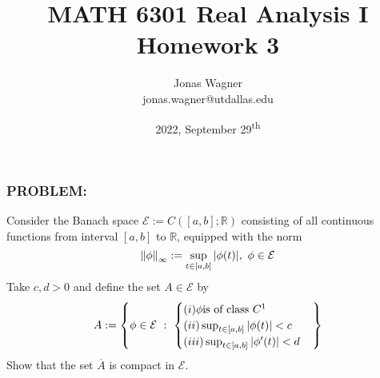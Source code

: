 \documentclass[]{article}
\title{MATH 6301 Real Analysis I \\ Homework 3}
\author{Jonas Wagner\\ jonas.wagner@utdallas.edu}
\date{2022, September 29\textsuperscript{th}}
\newcommand{\Problem}{\subsubsection*{\textbf{PROBLEM:}}}
\newcommand{\R}{\mathbb{R}}
\newcommand{\st}{\ : \ }
\begin{document}
\maketitle

\tableofcontents



\newpage
\section{}
\Problem
Consider the Banach space $\mathcal{E} := C([a,b];\R)$ consisting of all continuous functions from interval $[a,b]$ to $\R$, equipped with the norm \[
    \norm{\phi}_\infty := \sup_{t \in [a,b]} \abs{\phi(t)}, \ \phi \in \mathcal{E}
\]
Take $c,d > 0$ and define the set $A \in \mathcal{E}$ by \[
    A := \qty{
        \phi \in \mathcal{E} \st \begin{cases}
            (i) \phi \text{is of class } C^1 &\\
            (ii) \sup_{t \in [a,b]} \abs{\phi(t)} < c &\\
            (iii) \sup_{t \in [a,b]} \abs{\phi'(t)} < d
        \end{cases}
    } 
\]
Show that the set $\overline{A}$ is compact in $\mathcal{E}$.
\end{document}
